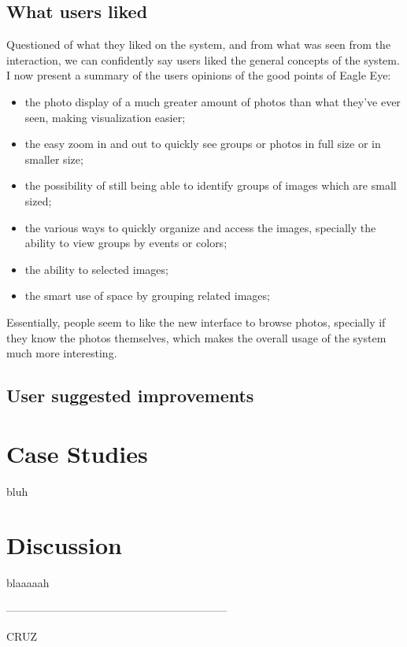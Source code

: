 \subsection{What users liked}

Questioned of what they liked on the system, and from what was seen from the interaction, we can confidently say users liked the general concepts of the system. I now present a summary of the users opinions of the good points of Eagle Eye:
\begin{itemize}
\item the photo display of a much greater amount of photos than what they've ever seen,  making visualization easier;
\item the easy zoom in and out to quickly see groups or photos in full size or in smaller size;
\item the possibility of still being able to identify groups of images which are small sized;
\item the various ways to quickly organize and access the images, specially the ability to view groups by events or colors;
\item the ability to selected images;
\item the smart use of space by grouping related images;
\end{itemize}

Essentially, people seem to like the new interface to browse photos, specially if they know the photos themselves, which makes the overall usage of the system much more interesting.

\subsection{User suggested improvements}


\section{Case Studies}

bluh

\section{Discussion}

blaaaaah


————————————————————

CRUZ

